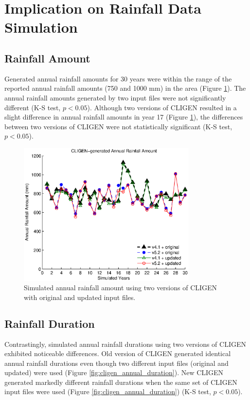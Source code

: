 \section{Implication on Rainfall Data Simulation}
\label{sec:RainfallSimulation}

\subsection{Rainfall Amount}
Generated annual rainfall amounts for 30 years were within the range of the
reported annual rainfall amounts (750 and 1000 mm) in the area (Figure
\ref{fig:cligen_annual_amount}). The annual rainfall amounts generated by two
input files were not significantly different (K-S test, $p<0.05$). Although two
versions of CLIGEN resulted in a slight difference in annual rainfall amounts in
year 17 (Figure \ref{fig:cligen_annual_amount}), the differences between two
versions of CLIGEN were not statistically significant (K-S test, $p<0.05$).

\begin{figure}[htbp]
  \centering

\includegraphics[width=0.8\textwidth]{./img/cligen_annual_amount_series}
  \caption{Simulated annual rainfall amount using two versions of CLIGEN
with original and updated input files.}
  \label{fig:cligen_annual_amount}
\end{figure}

\subsection{Rainfall Duration}
Contrastingly, simulated annual rainfall durations using two versions of CLIGEN
exhibited noticeable differences. Old version of CLIGEN generated identical
annual rainfall durations even though two different input files (original
and updated) were used (Figure \ref{fig:cligen_annual_duration}). New CLIGEN
generated markedly different rainfall durations when the same set of CLIGEN
input files were used (Figure \ref{fig:cligen_annual_duration}) (K-S test,
$p<0.05$).

